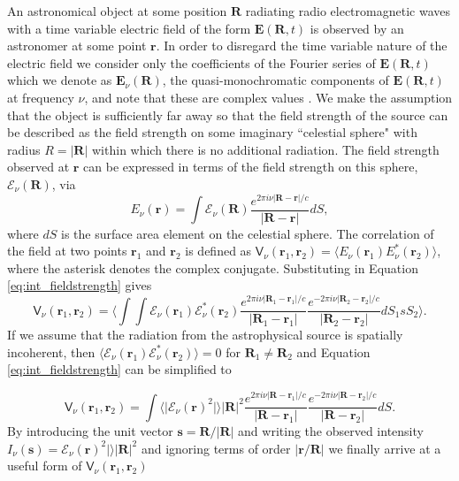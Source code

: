 An astronomical object at some position $\mathbf{R}$ radiating radio electromagnetic waves with a time variable electric field of the form $\mathbf{E}(\mathbf{R}, t)$ is observed by an astronomer at some point $\mathbf{r}$. In order to disregard the time variable nature of the electric field we consider only the coefficients of the Fourier series of $\mathbf{E}(\mathbf{R}, t)$ which we denote as $\mathbf{E}_\nu (\mathbf{R})$, the quasi-monochromatic components of $\mathbf{E}(\mathbf{R}, t)$ at frequency $\nu$, and note that these are complex values \citep{synthesisimaging1999}.	We make the assumption that the object is sufficiently far away so that the field strength of the source can be described as the field strength on some imaginary ``celestial sphere" with radius $R = \vert \mathbf{R} \vert$ within which there is no additional radiation. The field strength observed at $\mathbf{r}$ can be expressed in terms of the field strength on this sphere, $\mathcal{E}_\nu (\mathbf{R})$, via
\begin{equation}
\label{eq:int_fieldstrength}
E_\nu(\mathbf{r}) = \int \mathcal{E}_\nu (\mathbf{R}) \frac{e^{2\pi i \nu \vert \mathbf{R} - \mathbf{r} \vert/c}}{\vert \mathbf{R} - \mathbf{r} \vert} dS,
\end{equation}
where $dS$ is the surface area element on the celestial sphere. The correlation of the field at two points $\mathbf{r}_1$ and $\mathbf{r}_2$ is defined as $\mathsf{V}_\nu (\mathbf{r}_1, \mathbf{r}_2) = \langle E_\nu(\mathbf{r}_1) E^{*}_\nu(\mathbf{r}_2) \rangle$, where the asterisk denotes the complex conjugate. Substituting in Equation \ref{eq:int_fieldstrength} gives
\begin{equation}
\label{eq:int_correlation}
\mathsf{V}_\nu (\mathbf{r}_1, \mathbf{r}_2) = \bigg \langle \int \int \mathcal{E}_\nu(\mathbf{r}_1) \mathcal{E}^{*}_\nu(\mathbf{r}_2) 
\frac{e^{2\pi i \nu \vert \mathbf{R}_1 - \mathbf{r}_1 \vert/c}}{\vert \mathbf{R}_1 - \mathbf{r}_1 \vert} \frac{e^{-2\pi i \nu \vert \mathbf{R}_2 - \mathbf{r}_2 \vert/c}}{\vert \mathbf{R}_2 - \mathbf{r}_2 \vert} dS_1 sS_2 \bigg \rangle.
\end{equation}
If we assume that the radiation from the astrophysical source is spatially incoherent, then  $\langle \mathcal{E}_\nu(\mathbf{r}_1) \mathcal{E}^{*}_\nu(\mathbf{r}_2) \rangle = 0$ for $\mathbf{R}_1 \neq \mathbf{R}_2$ and Equation \ref{eq:int_fieldstrength} can be simplified to  

\begin{equation}
\label{eq:int_correlation2}
\mathsf{V}_\nu (\mathbf{r}_1, \mathbf{r}_2) =  \int \langle \vert \mathcal{E}_\nu(\mathbf{r})^2 \vert \rangle \vert \mathbf{R} \vert^2
\frac{e^{2\pi i \nu \vert \mathbf{R} - \mathbf{r}_1 \vert/c}}{\vert \mathbf{R} - \mathbf{r}_1 \vert} \frac{e^{-2\pi i \nu \vert \mathbf{R} - \mathbf{r}_2 \vert/c}}{\vert \mathbf{R} - \mathbf{r}_2 \vert} dS.
\end{equation}
By introducing the unit vector $\mathbf{s} = \mathbf{R}/ \vert \mathbf{R} \vert$ and writing the observed intensity $I_\nu(\mathbf{s}) = \mathcal{E}_\nu(\mathbf{r})^2 \vert \rangle \vert \mathbf{R} \vert^2$ and ignoring terms of order $\vert \mathbf{r}/\mathbf{R} \vert$ we finally arrive at a useful form of $\mathsf{V}_\nu (\mathbf{r}_1, \mathbf{r}_2)$

